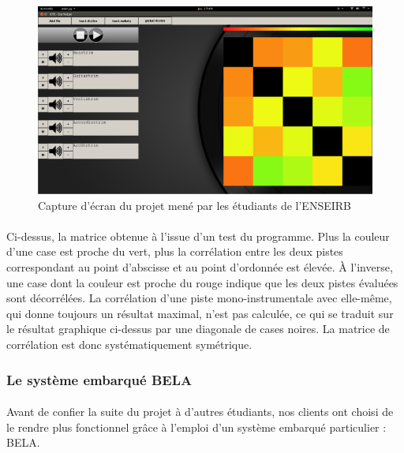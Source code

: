 \begin{figure}[h]
	\centering
	\includegraphics[scale=0.5]{matriceenseirb.png}
	\caption{Capture d'écran du projet mené par les étudiants de l'ENSEIRB}
	\label{matrice-enseirb}
\end{figure}

\paragraph{}
Ci-dessus, la matrice obtenue à l'issue d'un test du programme. Plus
la couleur d'une case est proche du vert, plus la corrélation entre
les deux pistes correspondant au point d'abscisse et au point
d'ordonnée est élevée. À l'inverse, une case dont la couleur est
proche du rouge indique que les deux pistes évaluées sont
décorrélées. La corrélation d'une piste mono-instrumentale avec
elle-même, qui donne toujours un résultat maximal, n'est pas calculée,
ce qui se traduit sur le résultat graphique ci-dessus par une
diagonale de cases noires. La matrice de corrélation est donc
systématiquement symétrique.

\subsubsection{Le système embarqué BELA}
\paragraph{}
Avant de confier la suite du projet à d'autres étudiants, nos clients
ont choisi de le rendre plus fonctionnel grâce à l'emploi d'un système
embarqué particulier : BELA.

